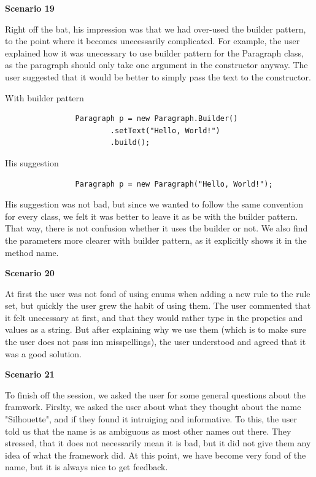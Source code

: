 \documentclass[12pt]{article}
\begin{document}
        \textbf{Scenario 19}

        Right off the bat, his impression was that we had over-used the builder pattern, to the point where it becomes unecessarily complicated. For example, the user explained how it was unecessary to use builder pattern for the Paragraph class, as the paragraph should only take one argument in the constructor anyway. The user suggested that it would be better to simply pass the text to the constructor.

        \begin{shaded}
            With builder pattern

            \begin{lstlisting}
                Paragraph p = new Paragraph.Builder()
                        .setText("Hello, World!")
                        .build();
            \end{lstlisting}

            His suggestion

            \begin{lstlisting}
                Paragraph p = new Paragraph("Hello, World!");
            \end{lstlisting}
        \end{shaded}

        His suggestion was not bad, but since we wanted to follow the same convention for every class, we felt it was better to leave it as be with the builder pattern. That way, there is not confusion whether it uses the builder or not. We also find the parameters more clearer with builder pattern, as it explicitly shows it in the method name.

        \textbf{Scenario 20}
        
        At first the user was not fond of using enums when adding a new rule to the rule set, but quickly the user grew the habit of using them. The user commented that it felt unecessary at first, and that they would rather type in the propeties and values as a string. But after explaining why we use them (which is to make sure the user does not pass inn misspellings), the user understood and agreed that it was a good solution.

        \textbf{Scenario 21}

        
                

        To finish off the session, we asked the user for some general questions about the framwork. Firslty, we asked the user about what they thought about the name "Silhouette", and if they found it intruiging and informative. To this, the user told us that the name is as ambiguous as most other names out there. They stressed, that it does not necessarily mean it is bad, but it did not give them any idea of what the framework did. At this point, we have become very fond of the name, but it is always nice to get feedback.
\end{document}
